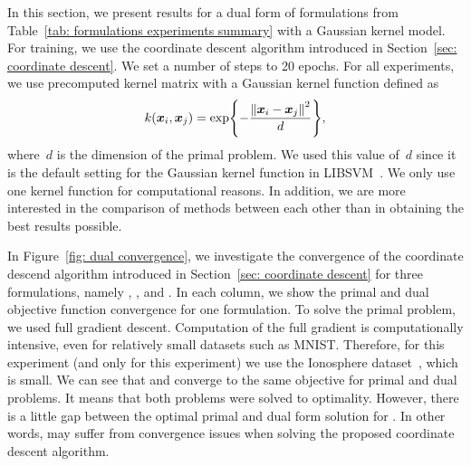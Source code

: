 In this section, we present results for a dual form of formulations from Table~\ref{tab: formulations experiments summary} with a Gaussian kernel model. For training, we use the coordinate descent algorithm introduced in Section~\ref{sec: coordinate descent}. We set a number of steps to 20 epochs. For all experiments, we use precomputed kernel matrix with a Gaussian kernel function defined as 
\begin{equation*}
  k(\bm{x}_i, \bm{x}_j) = \exp\Brac[c]{- \frac{\norm{\bm{x}_i - \bm{x}_j}^2}{d}},
\end{equation*}
where~$d$ is the dimension of the primal problem. We used this value of~$d$ since it is the default setting for the Gaussian kernel function in LIBSVM~\cite{chang2011libsvm}. We only use one kernel function for computational reasons. In addition, we are more interested in the comparison of methods between each other than in obtaining the best results possible.

In Figure~\ref{fig: dual convergence}, we investigate the convergence of the coordinate descend algorithm introduced in Section~\ref{sec: coordinate descent} for three formulations, namely \TopPush, \TopPushK, and \PatMatNP. In each column, we show the primal and dual objective function convergence for one formulation. To solve the primal problem, we used full gradient descent. Computation of the full gradient is computationally intensive, even for relatively small datasets such as MNIST. Therefore, for this experiment (and only for this experiment) we use the Ionosphere dataset~\cite{sigillito1989classification}, which is small. We can see that \TopPush and \TopPushK converge to the same objective for primal and dual problems. It means that both problems were solved to optimality. However, there is a little gap between the optimal primal and dual form solution for \PatMatNP. In other words, \PatMatNP may suffer from convergence issues when solving the proposed coordinate descent algorithm.  

